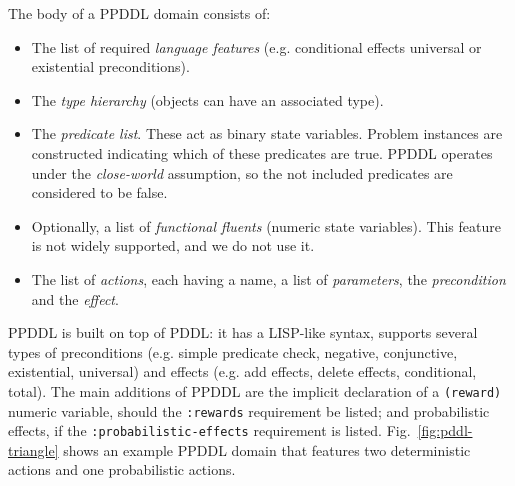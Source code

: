 \documentclass[../root.tex]{subfiles}
\begin{document}
The body of a PPDDL domain consists of:
\begin{itemize}
	\item The list of required \emph{language features} (e.g. conditional effects
	universal or existential preconditions).
	\item The \emph{type hierarchy} (objects can have an associated type).
	\item The \emph{predicate list}. These act as binary state variables. Problem
	instances are constructed indicating which of these predicates are true. PPDDL
	operates under the \emph{close-world} assumption, so the not included predicates
	are considered to be false.
	\item Optionally, a list of \emph{functional fluents} (numeric state variables).
	This feature is not widely supported, and we do not use it.
	\item The list of \emph{actions}, each having a name, a list of \emph{parameters},
	the \emph{precondition} and the \emph{effect}.
\end{itemize}

PPDDL is built on top of PDDL: it has a LISP-like syntax, supports several types
of preconditions (e.g. simple predicate check, negative, conjunctive,
existential, universal)
and effects (e.g. add effects, delete effects, conditional, total). The main
additions of PPDDL are the implicit declaration of a \texttt{(reward)}
numeric variable,
should the \texttt{:rewards} requirement be listed; and probabilistic
effects, if the \texttt{:probabilistic-effects} requirement is listed. Fig.~\ref{fig:pddl-triangle} shows an example PPDDL domain that features two
deterministic actions and one probabilistic actions.
\end{document}
